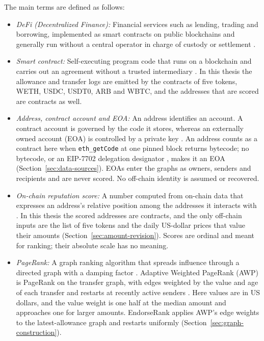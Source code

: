 The main terms are defined as follows:

\begin{itemize}
\item \emph{DeFi (Decentralized Finance):} Financial services such as lending, trading and borrowing, implemented as smart contracts on public blockchains and generally run without a central operator in charge of custody or settlement \parencite{schar2021defi}.
\item \emph{Smart contract:} Self-executing program code that runs on a blockchain and carries out an agreement without a trusted intermediary \parencite{szabo1997formalizing}. In this thesis the allowance and transfer logs are emitted by the contracts of five tokens, WETH, USDC, USDT0, ARB and WBTC, and the addresses that are scored are contracts as well.
\item \emph{Address, contract account and EOA:} An address identifies an account. A contract account is governed by the code it stores, whereas an externally owned account (EOA) is controlled by a private key \parencite{antonopoulos2018mastering}. An address counts as a contract here when \texttt{eth\_getCode} at one pinned block returns bytecode; no bytecode, or an EIP-7702 delegation designator \parencite{buterin2024eip7702}, makes it an EOA (Section~\ref{sec:data-sources}). EOAs enter the graphs as owners, senders and recipients and are never scored. No off-chain identity is assumed or recovered.
\item \emph{On-chain reputation score:} A number computed from on-chain data that expresses an address's relative position among the addresses it interacts with \parencite{do2023hodgerank}. In this thesis the scored addresses are contracts, and the only off-chain inputs are the list of five tokens and the daily US-dollar prices that value their amounts (Section~\ref{sec:amount-revision}). Scores are ordinal and meant for ranking; their absolute scale has no meaning.
\item \emph{PageRank:} A graph ranking algorithm that spreads influence through a directed graph with a damping factor \parencite{page1999pagerank}. Adaptive Weighted PageRank (AWP) is PageRank on the transfer graph, with edges weighted by the value and age of each transfer and restarts at recently active senders \parencite{do2023awp}. Here values are in US dollars, and the value weight is one half at the median amount and approaches one for larger amounts. EndorseRank applies AWP's edge weights to the latest-allowance graph and restarts uniformly (Section~\ref{sec:graph-construction}).

\end{itemize}
